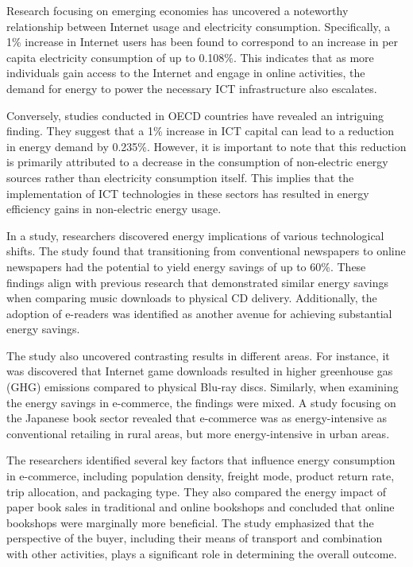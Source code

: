 \documentclass[
  a4paper,  %
  twoside,  %
  bibliography=totoc,
  headsepline,
  cleardoublepage=empty,
  parskip=half,
  draft=false
]{scrbook}
\begin{document}
Research focusing on emerging economies has uncovered a noteworthy relationship between Internet usage and electricity consumption. Specifically, a 1\% increase in Internet users has been found to correspond to an increase in per capita electricity consumption of up to 0.108\%. This indicates that as more individuals gain access to the Internet and engage in online activities, the demand for energy to power the necessary ICT infrastructure also escalates.

Conversely, studies conducted in OECD countries have revealed an intriguing finding. They suggest that a 1\% increase in ICT capital can lead to a reduction in energy demand by 0.235\%. However, it is important to note that this reduction is primarily attributed to a decrease in the consumption of non-electric energy sources rather than electricity consumption itself. This implies that the implementation of ICT technologies in these sectors has resulted in energy efficiency gains in non-electric energy usage.


In a study, researchers discovered energy implications of various technological shifts. The study found that transitioning from conventional newspapers to online newspapers had the potential to yield energy savings of up to 60\%. These findings align with previous research that demonstrated similar energy savings when comparing music downloads to physical CD delivery. Additionally, the adoption of e-readers was identified as another avenue for achieving substantial energy savings.

The study also uncovered contrasting results in different areas. For instance, it was discovered that Internet game downloads resulted in higher greenhouse gas (GHG) emissions compared to physical Blu-ray discs. Similarly, when examining the energy savings in e-commerce, the findings were mixed. A study focusing on the Japanese book sector revealed that e-commerce was as energy-intensive as conventional retailing in rural areas, but more energy-intensive in urban areas.

The researchers identified several key factors that influence energy consumption in e-commerce, including population density, freight mode, product return rate, trip allocation, and packaging type. They also compared the energy impact of paper book sales in traditional and online bookshops and concluded that online bookshops were marginally more beneficial. The study emphasized that the perspective of the buyer, including their means of transport and combination with other activities, plays a significant role in determining the overall outcome.
\end{document}
